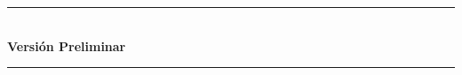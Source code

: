 
  \thispagestyle{empty}


    \begin{minipage}{0.85\textwidth}
    \end{minipage}%

    \vspace{14cm}
    \begin{minipage}{0.85\textwidth}
      \begin{center}
          \sffamily
          
          \rule{\textwidth}{0.2mm}
          \textbf{\ppidata} \\[0.5cm]
          \textbf{Versión Preliminar} \\[0.5cm]
          \rule{\textwidth}{0.2mm}\\
      \end{center}
    \end{minipage}%
    

